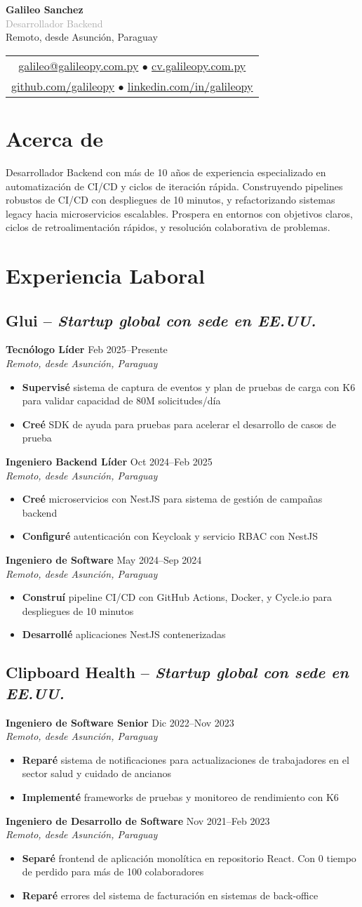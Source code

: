 \documentclass[11pt,a4paper]{article}
\newcommand{\actionverb}[1]{\textcolor{actioncolor}{\textbf{#1}}}
\newcommand{\cvheader}[5]{
  \begin{center}
    {\Huge \textbf{#1}}\\[0.4em]
    {\Large \textcolor{darkgray}{#2}}\\[1em]
    
    \textcolor{mediumgray}{#3}\\[0.6em]
    
    \begin{tabular}{c}
      \href{mailto:#4}{#4} $\bullet$ \href{https://#5}{#5}\\[0.3em]
      \href{https://github.com/galileopy}{github.com/galileopy} $\bullet$ 
      \href{https://www.linkedin.com/in/galileopy}{linkedin.com/in/galileopy}
    \end{tabular}
  \end{center}
  \vspace{1.2em}
}
\newcommand{\cvcompany}[3]{
  \subsection{#1 \textcolor{mediumgray}{#2}}
  #3
  \vspace{0.5em}
}
\newcommand{\cvrole}[4]{
  \textbf{#1} \hfill \textcolor{mediumgray}{\small #2}\\
  \textit{#3}
  \begin{itemize}
    #4
  \end{itemize}
  \vspace{1em}
}
\begin{document}
\cvheader{Galileo Sanchez}{Desarrollador Backend}{Remoto, desde Asunción, Paraguay}{galileo@galileopy.com.py}{cv.galileopy.com.py}

\section{Acerca de}
Desarrollador Backend con más de 10 años de experiencia especializado en automatización de CI/CD y ciclos de iteración rápida. Construyendo pipelines robustos de CI/CD con despliegues de 10 minutos, y refactorizando sistemas legacy hacia microservicios escalables. Prospera en entornos con objetivos claros, ciclos de retroalimentación rápidos, y resolución colaborativa de problemas.

\section{Experiencia Laboral}

\cvcompany{Glui}{-- \textit{Startup global con sede en EE.UU.}}{
  \cvrole{Tecnólogo Líder}{Feb 2025--Presente}{Remoto, desde Asunción, Paraguay}{
    \item \actionverb{Supervisé} sistema de captura de eventos y plan de pruebas de carga con K6 para validar capacidad de 80M solicitudes/día
    \item \actionverb{Creé} SDK de ayuda para pruebas para acelerar el desarrollo de casos de prueba
  }
  
  \cvrole{Ingeniero Backend Líder}{Oct 2024--Feb 2025}{Remoto, desde Asunción, Paraguay}{
    \item \actionverb{Creé} microservicios con NestJS para sistema de gestión de campañas backend
    \item \actionverb{Configuré} autenticación con Keycloak y servicio RBAC con NestJS
  }
  
  \cvrole{Ingeniero de Software}{May 2024--Sep 2024}{Remoto, desde Asunción, Paraguay}{
    \item \actionverb{Construí} pipeline CI/CD con GitHub Actions, Docker, y Cycle.io para despliegues de 10 minutos
    \item \actionverb{Desarrollé} aplicaciones NestJS contenerizadas
  }
}

\cvcompany{Clipboard Health}{-- \textit{Startup global con sede en EE.UU.}}{
  \cvrole{Ingeniero de Software Senior}{Dic 2022--Nov 2023}{Remoto, desde Asunción, Paraguay}{
    \item \actionverb{Reparé} sistema de notificaciones para actualizaciones de trabajadores en el sector salud y cuidado de ancianos
    \item \actionverb{Implementé} frameworks de pruebas y monitoreo de rendimiento con K6
  }
  
  \cvrole{Ingeniero de Desarrollo de Software}{Nov 2021--Feb 2023}{Remoto, desde Asunción, Paraguay}{
    \item \actionverb{Separé} frontend de aplicación monolítica en repositorio React. Con 0 tiempo de perdido para más de 100 colaboradores
    \item \actionverb{Reparé} errores del sistema de facturación en sistemas de back-office
  }
}
\end{document}
